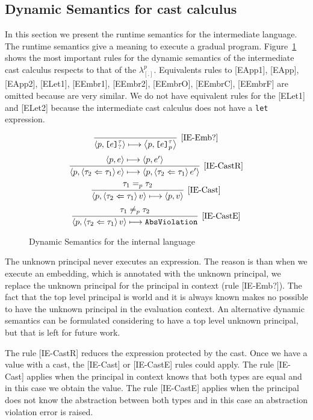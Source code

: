 \documentclass{article}
\newcommand{\emb}[3]{\texttt{[}#1\texttt{]}_{#2}^{#3}}
\newcommand{\eval}[2]{\left\langle {#1},{#2} \right\rangle}
\newcommand{\cast}[2]{\left\langle #1 \Leftarrow #2 \right\rangle}
\newcommand\icode[1]{\texttt{#1}}
\newcommand\rulename[1]{\mathrm{\text{[#1]}}}
\newcommand\irname[1]{[#1]}
\newcommand\newcalculus[0]{$\lambda^p_{\left[.\right]}$}
\begin{document}
\subsection{Dynamic Semantics for cast calculus}\label{sec:dyn-cast-calculus}
In this section we present the runtime semantics for the intermediate language. The runtime semantics give a meaning to execute a gradual program. Figure~\ref{fig:dyn_semantics_cast_calculus} shows the most important rules for the dynamic semantics of the intermediate cast calculus respects to that of the \newcalculus{}. Equivalents rules to \irname{EApp1}, \irname{EApp}, \irname{EApp2}, \irname{ELet1}, \irname{EEmbr1}, \irname{EEmbr2}, \irname{EEmbrO}, \irname{EEmbrC}, \irname{EEmbrF} are omitted because are very similar. We do not have equivalent rules for the \irname{ELet1} and \irname{ELet2} because the intermediate cast calculus does not have a \icode{let} expression. 

\begin{figure}[!htbp]
\[
\infer[\rulename{IE-Emb?}] 
{\eval{p}{\emb{e}{?}{\tau}} \longmapsto \eval{p}{\emb{e}{p}{\tau}}}
{} 
\]
\[
\infer[\rulename{IE-CastR}] 
{\eval{p}{\cast{\tau_2}{\tau_1} e} \longmapsto \eval{p}{\cast{\tau_2}{\tau_1} e'}}
{\eval{p}{e} \longmapsto \eval{p}{e'}} 
\]
\[
\infer[\rulename{IE-Cast}] 
{\eval{p}{\cast{\tau_2}{\tau_1} v} \longmapsto \eval{p}{v}}
{\tau_1 =_p \tau_2}
\]
\[
\infer[\rulename{IE-CastE}] 
{\eval{p}{\cast{\tau_2}{\tau_1} v} \longmapsto \icode{AbsViolation}}
{\tau_1 \neq_p \tau_2}
\]  
\caption{Dynamic Semantics for the internal language}
\label{fig:dyn_semantics_cast_calculus}
\end{figure}
The unknown principal never executes an expression. The reason is than when we execute an embedding, which is annotated with the unknown principal, we replace the unknown principal for the principal in context (rule \irname{IE-Emb?}). The fact that the top level principal is {\sf world} and it is always known makes no possible to have the unknown principal in the evaluation context. An alternative dynamic semantics can be formulated considering to have a top level unknown principal, but that is left for future work.

The rule \irname{IE-CastR} reduces the expression protected by the cast. Once we have a value with a cast, the \irname{IE-Cast} or \irname{IE-CastE} rules could apply. The rule \irname{IE-Cast} applies when the principal in context knows that both types are equal and in this case we obtain the value. The rule \irname{IE-CastE} applies when the principal does not know the abstraction between both types and in this case an abstraction violation error is raised.
\end{document}
